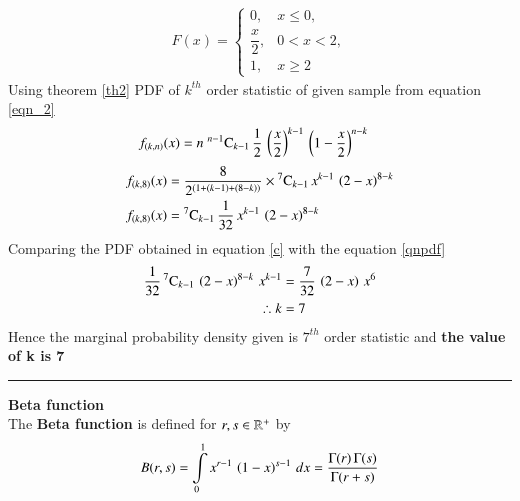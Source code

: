 \documentclass[journal,12pt,twocolumn]{IEEEtran}
\begin{document}
 \begin{align}
 F(x) = 
 \begin{cases}
      0,             &x \leq 0, \\ 
  \dfrac{x}{2},      &0 < x< 2, \\ 
     1,              & x\geq2
 \end{cases} \label{e}
 \end{align}
Using theorem \eqref{th2} PDF of $k^{th}$ order statistic of given sample from equation \eqref{eqn_2}
\begin{align}
f_{(k,n)}(x) &= n\;{}^{n-1}\mathrm{C}_{k-1}\,\dfrac{1}{2}\,\left(\dfrac{x}{2}\right)^{k-1}\,\left(1-\dfrac{x}{2}\right)^{n-k} 
\end{align}
\begin{align}
f_{(k,8)}(x) &= \dfrac{8}{2^{(1+(k-1)+(8-k))}}\times{}^{7}\mathrm{C}_{k-1}\,x^{k-1}\,\left(2-x\right)^{8-k}\\
f_{(k,8)}(x) &= {}^{7}\mathrm{C}_{k-1}\,\dfrac{1}{32}\,x^{k-1}\,\left(2-x\right)^{8-k} \label{c}
 \end{align}
Comparing the PDF obtained in equation \eqref{c} with the equation \eqref{qnpdf}
\begin{align}
\dfrac{1}{32}\,{}^{7}\mathrm{C}_{k-1}\,\left(2-x\right)^{8-k}\,x^{k-1} &= \dfrac{7}{32}\,\left(2-x\right)\,x^6 \\
\therefore k &= 7 
\end{align}
Hence the marginal probability density given is $7^{th}$ order statistic and 
\textbf{the value of k is 7} 
\vspace{0.5cm}
\hrule
\vspace{0.5cm}
\begin{definition}
\textbf{Beta function}\\
\label{def2}
 The \textbf{Beta function} is defined for $r, s \in \mathbb{R}^{+}$ by 
\begin{equation}
B(r,s) = \int\limits_{0}^{1} x^{r-1}\,\left(1-x\right)^{s-1}\,dx = \dfrac{\Gamma(r)\,\Gamma(s)}{\Gamma(r+s)} 
\label{eqn_5}
\end{equation}
\end{definition}
\end{document}
